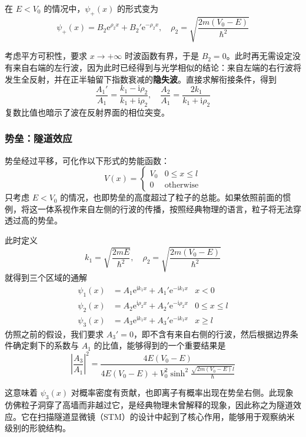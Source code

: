 \documentclass[cn,10pt,math=newtx,citestyle=gb7714-2015,bibstyle=gb7714-2015]{elegantbook}
\def\e{\mathrm e}
\def\i{\mathrm i}
\def\ra{\rightarrow}
\begin{document}
在 $E<V_0$ 的情况中，$\psi_+(x)$ 的形式变为
\begin{equation}
    \psi_+(x)=B_2\e^{\rho_2x}+B_2'\e^{-\rho_2x},\quad \rho_2=\sqrt{\frac{2m(V_0-E)}{\hbar^2}}
\end{equation}

考虑平方可积性，要求 $x\ra+\infty$ 时波函数有界，于是 $B_2=0$。此时再无需设定没有来自右端的左行波，因为此时已经得到与光学相似的结论：来自左端的右行波将发生全反射，并在正半轴留下指数衰减的\textbf{隐失波}。直接求解衔接条件，得到
\begin{equation*}
    \frac{A_1'}{A_1}=\frac{k_1-\i\rho_2}{k_1+\i\rho_2},\quad \frac{A_2}{A_1}=\frac{2k_1}{k_1+\i\rho_2}
\end{equation*}
复数比值也暗示了波在反射界面的相位突变。

\subsubsection{势垒：隧道效应}
势垒经过平移，可化作以下形式的势能函数：
\begin{equation}
    V(x)=\begin{cases}
        V_0 & 0\le x\le l\\
        0 & \text{otherwise}
    \end{cases}
\end{equation}
只考虑 $E<V_0$ 的情况，也即势垒的高度超过了粒子的总能。如果依照前面的惯例，将这一体系视作来自左侧的行波的传播，按照经典物理的语言，粒子将无法穿透过高的势垒。

此时定义
\begin{equation*}
    k_1=\sqrt{\frac{2mE}{\hbar^2}},\quad \rho_2=\sqrt{\frac{2m(V_0-E)}{\hbar ^2}}
\end{equation*}
就得到三个区域的通解
\begin{align}
    \psi_1(x)&=A_1\e^{\i k_1x}+A_1'\e^{-\i k_1x} & x<0\\
    \psi_2(x)&=A_2\e^{\i \rho_2x}+A_2'\e^{-\i \rho_2x} & 0\le x\le l\\
    \psi_3(x)&=A_3\e^{\i k_1x}+A_3'\e^{-\i k_1x} & x\ge l
\end{align}
仿照之前的假设，我们要求 $A_3'=0$，即不含有来自右侧的行波，然后根据边界条件确定剩下的系数与 $A_1$ 的比值，能够得到的一个重要结果是
\begin{equation*}
    \left|\frac{A_3}{A_1}\right|^2=\frac{4E(V_0-E)}{4E(V_0-E)+V_0^2\sinh^2\frac{\sqrt{2m(V_0-E)}l}{\hbar}}
\end{equation*}

这意味着 $\psi_3(x)$ 对概率密度有贡献，也即离子有概率出现在势垒右侧。此现象仿佛粒子洞穿了高墙而非越过它，是经典物理未曾解释的现象，因此称之为隧道效应。它在扫描隧道显微镜（STM）的设计中起到了核心作用，能够用于观察纳米级别的形貌结构。
\end{document}

